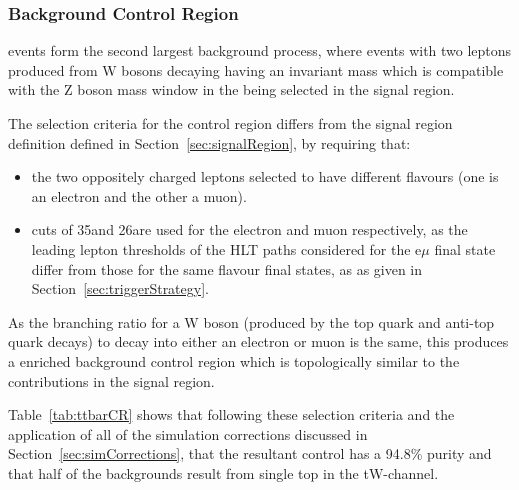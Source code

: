 \subsubsection{\ttbar Background Control Region}\label{subsec:ttbarCR}
\ttbar events form the second largest background process, where events with two leptons produced from W bosons decaying having an invariant mass which is compatible with the Z boson mass window in the being selected in the signal region.

The selection criteria for the \ttbar control region differs from the signal region definition defined in Section~\ref{sec:signalRegion}, by requiring that:
\begin{itemize}
\item the two oppositely charged leptons selected to have different flavours (\ie one is an electron and the other a muon).
\item \pt cuts of 35\GeV and 26\GeV are used for the electron and muon respectively, as the leading lepton \pt thresholds of the HLT paths considered for the e$\mu$ final state differ from those for the same flavour final states, as as given in Section~\ref{sec:triggerStrategy}. 
\end{itemize} 

As the branching ratio for a W boson (produced by the top quark and anti-top quark decays) to decay into either an electron or muon is the same, this produces a \ttbar enriched background control region which is topologically similar to the \ttbar contributions in the signal region. 

Table~\ref{tab:ttbarCR} shows that following these selection criteria and the application of all of the simulation corrections discussed in Section~\ref{sec:simCorrections}, that the resultant control has a 94.8\% purity and that half of the backgrounds result from single top in the tW-channel.


